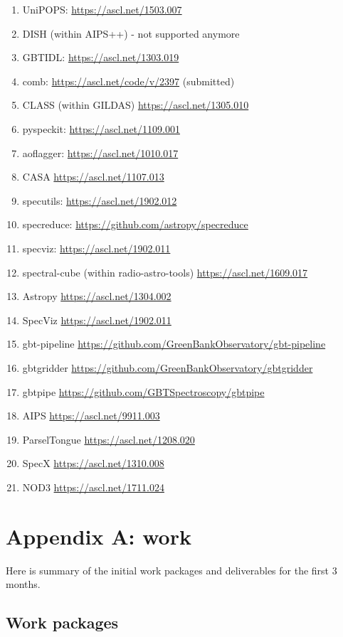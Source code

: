 \documentclass[12pt,a4paper]{article}
\begin{document}
\begin{enumerate}
\item UniPOPS: \url{https://ascl.net/1503.007}
\item DISH (within AIPS++) - not supported anymore
\item GBTIDL: \url{https://ascl.net/1303.019}
\item comb: \url{https://ascl.net/code/v/2397}   (submitted)
\item CLASS (within GILDAS) \url{https://ascl.net/1305.010}
\item pyspeckit: \url{https://ascl.net/1109.001}
\item aoflagger: \url{https://ascl.net/1010.017}
\item CASA \url{https://ascl.net/1107.013}
\item specutils: \url{https://ascl.net/1902.012}
\item specreduce:  \url{https://github.com/astropy/specreduce}
\item specviz: \url{https://ascl.net/1902.011}
\item spectral-cube (within radio-astro-tools) \url{https://ascl.net/1609.017}
\item Astropy \url{https://ascl.net/1304.002}
\item SpecViz \url{https://ascl.net/1902.011}
\item gbt-pipeline \url{https://github.com/GreenBankObservatory/gbt-pipeline}
\item gbtgridder \url{https://github.com/GreenBankObservatory/gbtgridder}
\item gbtpipe \url{https://github.com/GBTSpectroscopy/gbtpipe}
\item AIPS \url{https://ascl.net/9911.003}
\item ParselTongue \url{https://ascl.net/1208.020}
\item SpecX \url{https://ascl.net/1310.008}
\item NOD3 \url{https://ascl.net/1711.024}

\end{enumerate}




\newpage
\section*{Appendix A: work}

Here is summary of the initial work packages and deliverables for the first 3 months.
\subsection{Work packages}
\end{document}
